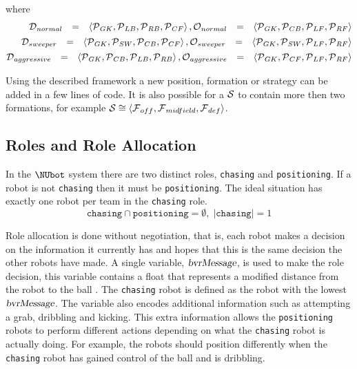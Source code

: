 where
\begin{eqnarray*}
\begin{matrix}
\FormationDef_{normal} &=& \left\langle \Position_{GK}, \Position_{LB}, \Position_{RB}, \Position_{CF} \right\rangle,
\FormationOff_{normal} &=& \left\langle \Position_{GK}, \Position_{CB}, \Position_{LF}, \Position_{RF} \right\rangle    \end{matrix} \\
\begin{matrix}
\FormationDef_{sweeper} &=& \left\langle \Position_{GK}, \Position_{SW}, \Position_{CB}, \Position_{CF} \right\rangle,
\FormationOff_{sweeper} &=& \left\langle \Position_{GK}, \Position_{SW}, \Position_{LF}, \Position_{RF} \right\rangle   \end{matrix} \\
\begin{matrix}
\FormationDef_{aggressive} &=& \left\langle \Position_{GK}, \Position_{CB}, \Position_{LB}, \Position_{RB} \right\rangle, 
\FormationOff_{aggressive} &=& \left\langle \Position_{GK}, \Position_{CF}, \Position_{LF}, \Position_{RF} \right\rangle  \end{matrix} \\
\end{eqnarray*}

Using the described framework a new position, formation or strategy can be added in a few lines of code. It is also possible for a $\Highlevel$ to contain more then two formations, for example $\Highlevel \cong \left\langle \Formation_{off},\Formation_{midfield},\Formation_{def} \right\rangle$.

\subsection{Roles and Role Allocation}
\label{subsec:roleallocation}

In the $\NUbot$ system there are two distinct roles, \texttt{chasing}
and \texttt{positioning}. If a robot is not \texttt{chasing} then it
must be \texttt{positioning}. The ideal situation has exactly one
robot per team in the \texttt{chasing} role.
\begin{equation*}
 \texttt{chasing} \cap \texttt{positioning} =  \emptyset, \; \left|\texttt{chasing}\right| = 1
\end{equation*}

Role allocation is done without negotiation, that is, each robot
makes a decision on the information it currently has and hopes that
this is the same decision the other robots have made.  A single variable, $\distance$, is used to make the role decision, this variable contains a float that represents a modified distance from the robot to the ball \cite{NUBOT2005}. The \texttt{chasing} robot is defined as the robot with the lowest $\distance$. The variable also encodes additional information such as attempting a grab, dribbling and kicking. This extra information allows the \texttt{positioning} robots to perform different actions depending on what the \texttt{chasing} robot is actually doing. For
example, the robots should position differently when the \texttt{chasing} robot has gained control of the ball and is
dribbling. 

